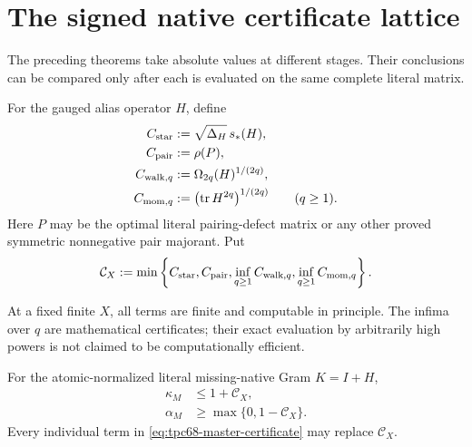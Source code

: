 \section{The signed native certificate lattice}
\label{sec:tpc68-certificate-lattice}

The preceding theorems take absolute values at different stages.  Their
conclusions can be compared only after each is evaluated on the same
complete literal matrix.

\begin{definition}
\label{def:tpc68-certificate-family}
For the gauged alias operator \(H\), define
\begin{align}
 C_{\rm star}
 &:=\sqrt{\Delta_H}\,s_*(H),
 \label{eq:tpc68-C-star}\\
 C_{\rm pair}
 &:=\rho(P),
 \label{eq:tpc68-C-pair}\\
 C_{{\rm walk},q}
 &:=\Omega_{2q}(H)^{1/(2q)},
 \label{eq:tpc68-C-walk}\\
 C_{{\rm mom},q}
 &:=\bigl(\operatorname{tr} H^{2q}\bigr)^{1/(2q)}
 \qquad(q\ge1).
 \label{eq:tpc68-C-moment}
\end{align}
Here \(P\) may be the optimal literal pairing-defect matrix or any other
proved symmetric nonnegative pair majorant.  Put
\begin{equation}
 \mathcal C_X
 :=
 \min\left\{
 C_{\rm star},C_{\rm pair},
 \inf_{q\ge1}C_{{\rm walk},q},
 \inf_{q\ge1}C_{{\rm mom},q}
 \right\}.
 \label{eq:tpc68-master-certificate}
\end{equation}
\end{definition}

At a fixed finite \(X\), all terms are finite and computable in principle.
The infima over \(q\) are mathematical certificates; their exact
evaluation by arbitrarily high powers is not claimed to be computationally
efficient.

\begin{theorem}
\label{thm:tpc68-native-certificate-lattice}
For the atomic-normalized literal missing-native Gram \(K=I+H\),
\begin{align}
 \kappa_M
 &\le1+\mathcal C_X,
 \label{eq:tpc68-kappa-lattice}\\
 \alpha_M
 &\ge\max\{0,1-\mathcal C_X\}.
 \label{eq:tpc68-alpha-lattice}
\end{align}
Every individual term in
\eqref{eq:tpc68-master-certificate} may replace \(\mathcal C_X\).
\end{theorem}

